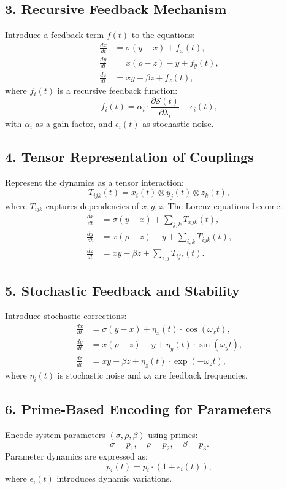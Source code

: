 \documentclass{article}
\theoremstyle{plain}
\begin{document}
\subsection*{3. Recursive Feedback Mechanism}
Introduce a feedback term $f(t)$ to the equations:
\begin{align}
\frac{dx}{dt} &= \sigma (y - x) + f_x(t), \\
\frac{dy}{dt} &= x(\rho - z) - y + f_y(t), \\
\frac{dz}{dt} &= xy - \beta z + f_z(t),
\end{align}
where $f_i(t)$ is a recursive feedback function:
\[
f_i(t) = \alpha_i \cdot \frac{\partial \mathcal{S}(t)}{\partial \lambda_i} + \epsilon_i(t),
\]
with $\alpha_i$ as a gain factor, and $\epsilon_i(t)$ as stochastic noise.

\subsection*{4. Tensor Representation of Couplings}
Represent the dynamics as a tensor interaction:
\[
T_{ijk}(t) = x_i(t) \otimes y_j(t) \otimes z_k(t),
\]
where $T_{ijk}$ captures dependencies of $x, y, z$. The Lorenz equations become:
\begin{align}
\frac{dx}{dt} &= \sigma (y - x) + \sum_{j,k} T_{xjk}(t), \\
\frac{dy}{dt} &= x(\rho - z) - y + \sum_{i,k} T_{iyk}(t), \\
\frac{dz}{dt} &= xy - \beta z + \sum_{i,j} T_{ijz}(t).
\end{align}

\subsection*{5. Stochastic Feedback and Stability}
Introduce stochastic corrections:
\begin{align}
\frac{dx}{dt} &= \sigma (y - x) + \eta_x(t) \cdot \cos(\omega_x t), \\
\frac{dy}{dt} &= x(\rho - z) - y + \eta_y(t) \cdot \sin(\omega_y t), \\
\frac{dz}{dt} &= xy - \beta z + \eta_z(t) \cdot \exp(-\omega_z t),
\end{align}
where $\eta_i(t)$ is stochastic noise and $\omega_i$ are feedback frequencies.

\subsection*{6. Prime-Based Encoding for Parameters}
Encode system parameters $(\sigma, \rho, \beta)$ using primes:
\[
\sigma = p_1, \quad \rho = p_2, \quad \beta = p_3.
\]
Parameter dynamics are expressed as:
\[
p_i(t) = p_i \cdot \left(1 + \epsilon_i(t)\right),
\]
where $\epsilon_i(t)$ introduces dynamic variations.
\end{document}
